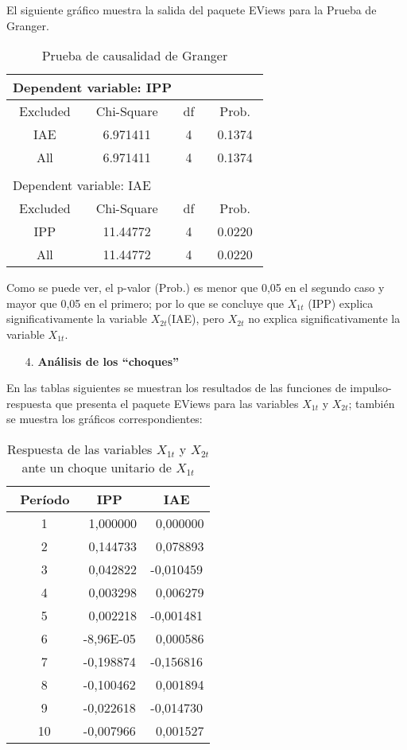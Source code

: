 \begin{enumerate}
El siguiente gr\'{a}fico muestra la salida del paquete EViews para la Prueba de Granger. 

\begin{table}[H]
\centering
\begin{tabular}{cccc}\hline
\multicolumn{3}{l}{Dependent variable: IPP} & \\ \hline
~Excluded~ & ~Chi-Square~ & ~df~ & ~Prob.~ \\ \hline\hline
IAE & 6.971411 & 4 & 0.1374 \\ \hline\hline
All & 6.971411 & 4 & 0.1374 \\ \hline\hline
\multicolumn{3}{l}{ } & \\ \hline
\multicolumn{3}{l}{Dependent variable: IAE} & \\ \hline
~Excluded~ & ~Chi-Square~ & ~df~ & ~Prob.~ \\ \hline\hline
IPP & 11.44772 & 4 & 0.0220 \\ \hline\hline
All & 11.44772 & 4 & 0.0220 \\ \hline\hline
\end{tabular}
\caption{Prueba de causalidad de Granger}
\label{tab40}
\end{table}

Como se puede ver, el p-valor (Prob.) es menor que 0,05 en el segundo caso y mayor que 0,05 en el primero; por lo que se concluye que $X_{1t}$ (IPP) explica significativamente la variable $X_{2t}$(IAE), pero $X_{2t}$ no explica significativamente la variable $X_{1t}$.

\begin{enumerate}
      \item[4.] \textbf{An\'{a}lisis de los ``choques''}
\end{enumerate}

En las tablas siguientes se muestran los resultados de las funciones de impulso-respuesta que presenta el paquete EViews para las variables $X_{1t}$ y $X_{2t}$; tambi\'{e}n se muestra los gr\'{a}ficos correspondientes:

\begin{table}[H]
\centering
\begin{tabular}{ccc}\hline
~Per\'{i}odo & IPP & IAE \\ \hline \hline
~1 & ~1,000000 & ~0,000000 \\
~2 & ~0,144733 & ~0,078893 \\
~3 & ~0,042822 & -0,010459 \\
~4 & ~0,003298 & ~0,006279 \\
~5 & ~0,002218 & -0,001481 \\
~6 & -8,96E-05 & ~0,000586 \\
~7 & -0,198874 & -0,156816 \\
~8 & -0,100462 & ~0,001894 \\
~9 & -0,022618 & -0,014730 \\
~10& -0,007966 & ~0,001527 \\ \hline \hline
\end{tabular}
\caption{Respuesta de las variables $X_{1t}$ y $X_{2t}$ ante un choque unitario de $X_{1t}$}
\label{tab41}
\end{table}


\end{enumerate}
